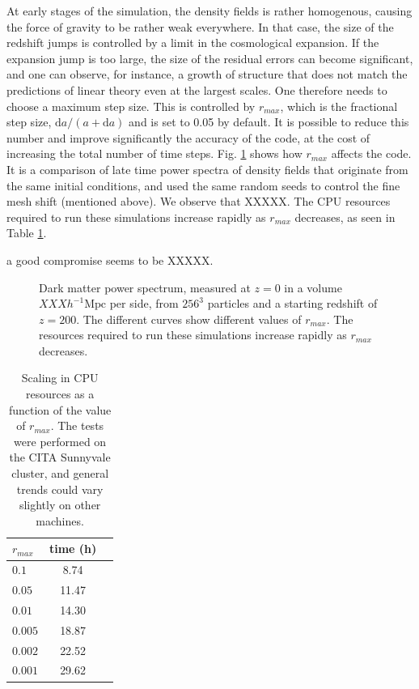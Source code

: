 At early stages of the simulation, the density fields is rather homogenous, causing the force of gravity to be
rather weak everywhere. In that case, the size of the redshift jumps is controlled by a limit in the cosmological expansion.
If the expansion jump is too large, the size of the residual errors can become significant, and one can observe, for instance,
a growth of structure that does not match the predictions of  linear theory even at the largest scales.
One therefore needs to choose a maximum step size. This is controlled by $r_{max}$, which is the fractional step size,
$\mbox{d}a/(a + \mbox{d}a)$ and is set to 0.05 by default.  It is possible to reduce this number and improve significantly 
the accuracy of the code, at the cost of increasing the total number of time steps. Fig. \ref{fig:ra_max}
shows how $r_{max}$ affects the code. It is a comparison of late time power spectra of density fields that originate from the same initial conditions, 
and used the same random seeds to control the fine mesh shift (mentioned above). We observe that XXXXX.
The {\small CPU} resources required to run these simulations increase rapidly as $r_{max}$ decreases, as seen in Table \ref{table:ra_max}. 

a good compromise seems to be XXXXX.

\begin{figure}%
  \begin{center}
  \caption{Dark matter power spectrum, measured at $z=0$ in a volume $XXX h^{-1}\mbox{Mpc}$ per side,
  from $256^3$ particles and a starting redshift of $z=200$. The different curves show different values of $r_{max}$. 
  The resources required to run these simulations increase rapidly as $r_{max}$ decreases.    \label{fig:ra_max}}
\end{center}
\end{figure}

\begin{table}
\begin{center}
\caption{Scaling in {\small CPU} resources as a function of the value of $r_{max}$. The tests were performed 
on the CITA Sunnyvale cluster, and general trends could vary slightly on other machines.}
\begin{tabular}{|l|c|c|}
\hline 
$r_{max}$         & time (h)   \\                 
\hline
 $0.1$ & 8.74 \\
 $0.05$ & 11.47\\
 $0.01$ & 14.30 \\
 $0.005$ & 18.87\\
 $0.002$ & 22.52\\
 $0.001$ & 29.62\\
\hline
\end{tabular}
\label{table:ra_max}
\end{center}
\end{table}


